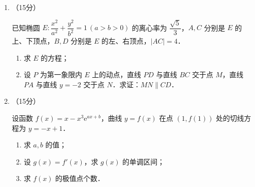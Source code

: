 \begin{description}
\begin{enumerate}[leftmargin=5pt]
        \begin{center}
\end{center}

        用频率估计概率．

        \begin{enumerate}[label=(\arabic*)]
            \item 试估计该农产品价格"上涨"的概率；
            \item 假设该农产品每天的价格变化是相互独立的．在未来的三个交易日中，用 $X$ 表示"上涨"的天数，求 $X$ 的分布列和数学期望；
            \item 用"上涨"天数占三个交易日的比例来估计该农产品价格的变化趋势，写出你的判断结论（不需要证明）．
        \end{enumerate}

        \item （15分）

        已知椭圆 $E:\dfrac{x^2}{a^2}+\dfrac{y^2}{b^2}=1\,(a>b>0)$ 的离心率为 $\dfrac{\sqrt{5}}{3}$，$A,C$ 分别是 $E$ 的上、下顶点，$B,D$ 分别是 $E$ 的左、右顶点，$|AC|=4$．

        \begin{enumerate}[label=(\arabic*)]
            \item 求 $E$ 的方程；
            \item 设 $P$ 为第一象限内 $E$ 上的动点，直线 $PD$ 与直线 $BC$ 交于点 $M$，直线 $PA$ 与直线 $y=-2$ 交于点 $N$．求证：$MN\parallel CD$．
        \end{enumerate}

        \item （15分）

        设函数 $f(x)=x-x^3\mathrm{e}^{ax+b}$，曲线 $y=f(x)$ 在点 $(1,f(1))$ 处的切线方程为 $y=-x+1$．

        \begin{enumerate}[label=(\arabic*)]
            \item 求 $a,b$ 的值；
            \item 设 $g(x)=f'(x)$，求 $g(x)$ 的单调区间；
            \item 求 $f(x)$ 的极值点个数．
        \end{enumerate}


\end{enumerate}
\end{description}
